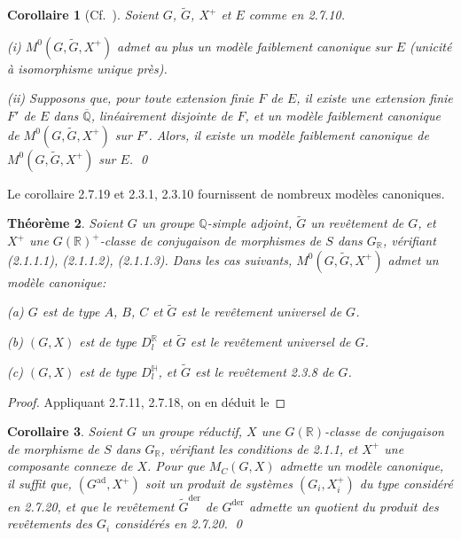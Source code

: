\documentclass[12pt,a4paper]{article}
\theoremstyle{plain}
\newtheorem{theorem}{Th\'eor\`eme}[section]
\newtheorem{corollary}[theorem]{Corollaire}
\theoremstyle{definition}
\theoremstyle{remark}
\newcommand{\QQ}{\mathbb{Q}}
\newcommand{\RR}{\mathbb{R}}
\begin{document}
\begin{corollary}[Cf.~{\cite[5.5, 5.10, 5.10.2]{deligne71}}]
Soient $G$, $\tilde{G}$, $X^+$ et $E$ comme en 2.7.10.

\textup{(i)} $M^0(G,\tilde{G},X^+)$ admet au plus un mod\`ele faiblement canonique sur $E$ (unicit\'e \`a isomorphisme unique pr\`es).

\textup{(ii)} Supposons que, pour toute extension finie $F$ de $E$, il existe une extension finie $F'$ de $E$ dans $\overline{\QQ}$, lin\'eairement disjointe de $F$, et un mod\`ele faiblement canonique de $M^0(G,\tilde{G},X^+)$ sur $F'$. Alors, il existe un mod\`ele faiblement canonique de $M^0(G,\tilde{G},X^+)$ sur $E$.
\qed
\end{corollary}

Le corollaire 2.7.19 et 2.3.1, 2.3.10 fournissent de nombreux mod\`eles canoniques.

\begin{theorem}
Soient $G$ un groupe $\QQ$-simple adjoint, $\tilde{G}$ un rev\^etement de $G$, et $X^+$ une $G(\RR)^+$-classe de conjugaison de morphismes de $S$ dans $G_{\RR}$, v\'erifiant (2.1.1.1), (2.1.1.2), (2.1.1.3). Dans les cas suivants, $M^0(G,\tilde{G},X^+)$ admet un mod\`ele canonique:

\textup{(a)} $G$ est de type $A$, $B$, $C$ et $\tilde{G}$ est le rev\^etement universel de $G$.

\textup{(b)} $(G,X)$ est de type $D_l^{\RR}$ et $\tilde{G}$ est le rev\^etement universel de $G$.

\textup{(c)} $(G,X)$ est de type $D_l^{\mathbb{H}}$, et $\tilde{G}$ est le rev\^etement 2.3.8 de $G$.
\end{theorem}

\begin{proof}
Appliquant 2.7.11, 2.7.18, on en d\'eduit le
\end{proof}

\begin{corollary}
Soient $G$ un groupe r\'eductif, $X$ une $G(\RR)$-classe de conjugaison de morphisme de $S$ dans $G_{\RR}$, v\'erifiant les conditions de 2.1.1, et $X^+$ une composante connexe de $X$. Pour que $M_C(G,X)$ admette un mod\`ele canonique, il suffit que, $(G^{\text{ad}}, X^+)$ soit un produit de syst\`emes $(G_i, X_i^+)$ du type consid\'er\'e en 2.7.20, et que le rev\^etement $\tilde{G}^{\text{der}}$ de $G^{\text{der}}$ admette un quotient du produit des rev\^etements des $G_i$ consid\'er\'es en 2.7.20.
\qed
\end{corollary}
\end{document}
